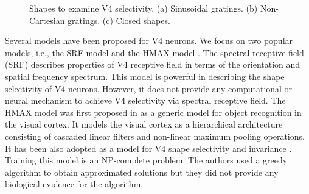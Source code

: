 \documentclass[twocolumn]{article}
\begin{document}
\begin{figure}[!t]
\centering
{}\hfil
{}\hfil
{}
\caption{Shapes to examine V4 selectivity.
(a) Sinusoidal gratings. (b) Non-Cartesian gratings. (c) Closed shapes.}
\label{fig:2}
\end{figure}

Several models have been proposed for V4 neurons.
We focus on two popular models, i.e., the SRF model \cite{david2006} and the HMAX model \cite{cadieu2007}.
The spectral receptive field (SRF) \cite{david2006} describes properties of V4 receptive field in terms of the orientation and spatial frequency spectrum.
This model is powerful in describing the shape selectivity of V4 neurons.
However, it does not provide any computational or neural mechanism to achieve V4 selectivity via spectral receptive field.
The HMAX model was first proposed in \cite{riesenhuber1999} as a generic model for object recognition in the visual cortex.
It models the visual cortex as a hierarchical architecture consisting of cascaded linear filters and non-linear maximum pooling operations.
It has been also adopted as a model for V4 shape selectivity and invariance \cite{cadieu2007}.
Training this model is an NP-complete problem. 
The authors used a greedy algorithm to obtain approximated solutions but they did not provide any biological evidence for the algorithm. 
\end{document}
